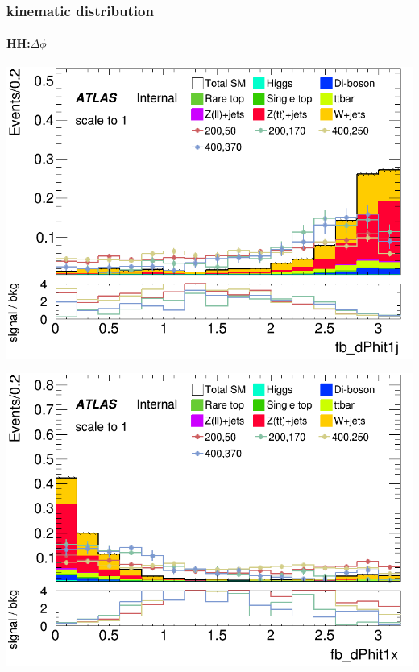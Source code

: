 \documentclass[usenames,dvipsnames]{beamer}
\begin{document}
\begin{frame}
  \frametitle{kinematic distribution}
  \framesubtitle{HH:$\Delta\phi$}
    \begin{minipage}{0.32\textwidth}
        \centering
        \includegraphics[width=\textwidth]{graphics/HH_met_sig/HH_fb_dPhit1j_norm.png}
    \end{minipage}
    \hfill
    \begin{minipage}{0.32\textwidth}
        \centering
        \includegraphics[width=\textwidth]{graphics/HH_met_sig/HH_fb_dPhit1x_norm.png}
    \end{minipage}
    \hfill
    \begin{minipage}{0.32\textwidth}
        \centering

\end{minipage}
\end{frame}
\end{document}
